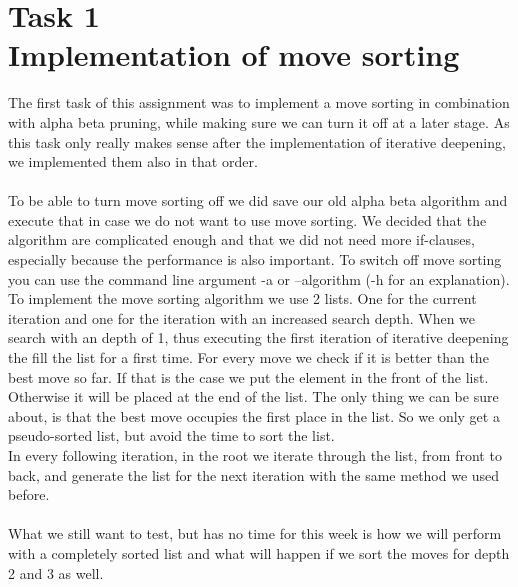\section{Task 1 \\ Implementation of move sorting}
The first task of this assignment was to implement a move sorting in combination with alpha beta pruning, while making sure we can turn it off at a later stage. As this task only really makes sense after the implementation of iterative deepening, we implemented them also in that order.\\\\
To be able to turn move sorting off we did save our old alpha beta algorithm and execute that in case we do not want to use move sorting. We decided that the algorithm are complicated enough and that we did not need more if-clauses, especially because the performance is also important. To switch off move sorting you can use the command line argument -a or --algorithm (-h for an explanation).\\

To implement the move sorting algorithm we use 2 lists. One for the current iteration and one for the iteration with an increased search depth. When we search with an depth of 1, thus executing the first iteration of iterative deepening the fill the list for a first time. For every move we check if it is better than the best move so far. If that is the case we put the element in the front of the list. Otherwise it will be placed at the end of the list. The only thing we can be sure about, is that the best move occupies the first place in the list. So we only get a pseudo-sorted list, but avoid the time to sort the list.\\
In every following iteration, in the root we iterate through the list, from front to back, and generate the list for the next iteration with the same method we used before.\\\\
What we still want to test, but has no time for this week is how we will perform with a completely sorted list and what will happen if we sort the moves for depth 2 and 3 as well.